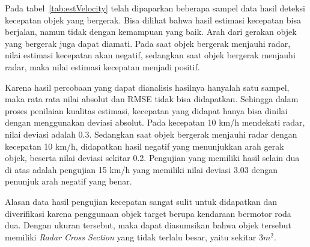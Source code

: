 Pada tabel~\ref{tab:estVelocity} telah dipaparkan beberapa sampel data hasil deteksi kecepatan objek yang bergerak. Bisa dilihat bahwa hasil estimasi kecepatan bisa berjalan, namun tidak dengan kemampuan yang baik. Arah dari gerakan objek yang bergerak juga dapat diamati. Pada saat objek bergerak menjauhi radar, nilai estimasi kecepatan akan negatif, sedangkan saat objek bergerak menjauhi radar, maka nilai estimasi kecepatan menjadi positif.

Karena hasil percobaan yang dapat dianalisis hasilnya hanyalah satu sampel, maka rata rata nilai absolut dan RMSE tidak bisa didapatkan. Sehingga dalam proses penilaian kualitas estimasi, kecepatan yang didapat hanya bisa dinilai dengan menggunakan deviasi absolut. Pada kecepatan 10 km/h mendekati radar, nilai deviasi adalah 0.3. Sedangkan saat objek bergerak menjauhi radar dengan kecepatan 10 km/h, didapatkan hasil negatif yang menunjukkan arah gerak objek, beserta nilai deviasi sekitar 0.2. Pengujian yang memiliki hasil selain dua di atas adalah pengujian 15 km/h yang memiliki nilai deviasi 3.03 dengan penunjuk arah negatif yang benar.

Alasan data hasil pengujian kecepatan sangat sulit untuk didapatkan dan diverifikasi karena penggunaan objek target berupa kendaraan bermotor roda dua. Dengan ukuran tersebut, maka dapat diasumsikan bahwa objek tersebut memiliki \textit{Radar Cross Section} yang tidak terlalu besar, yaitu sekitar $3 m^{2}$.